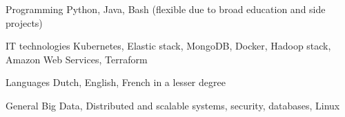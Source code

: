 


\begin{cvskills}


\cvskill
{Programming} %
{Python, Java, Bash (flexible due to broad education and side projects)} %


\cvskill
{IT technologies} %
{Kubernetes, Elastic stack, MongoDB, Docker, Hadoop stack, Amazon Web Services, Terraform} %


\cvskill
{Languages} %
{Dutch, English, French in a lesser degree} %


\cvskill
{General} %
{Big Data, Distributed and scalable systems, security, databases, Linux} %

\end{cvskills}